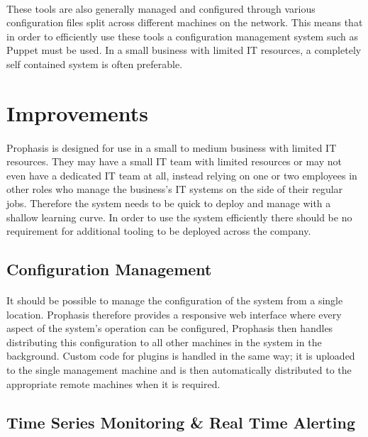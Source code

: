 \documentclass[bsc,logo,twoside]{infthesis}
\begin{document}
\paragraph*{}	
	These tools are also generally managed and configured through various
	configuration files split across different machines on the network. This means
	that in order to efficiently use these tools a configuration management system
	such as	Puppet must be used. In a small business with limited IT resources, a
	completely self contained system is often preferable.

\section{Improvements}
\paragraph*{}
	Prophasis is designed for use in a small to medium business with limited IT
	resources.  They may have a small IT team with limited resources or may not
	even have a dedicated IT team at all, instead relying on one or two employees
	in other roles who manage the business's IT systems on the side of their
	regular jobs. Therefore the system needs to be quick to deploy and manage with
	a shallow learning curve. In order to use the system efficiently there should
	be no requirement for additional tooling to be deployed across the company.
	
\subsection{Configuration Management}
\paragraph*{}
	It should be possible to manage the configuration of the system from a single
	location.  Prophasis therefore provides a responsive web interface where every
	aspect of the system's operation can be configured, Prophasis then handles
	distributing this configuration to all other machines in the system in the
	background. Custom code for plugins is handled in the same way; it is uploaded
	to the single management machine and is then automatically distributed to the
	appropriate remote machines when it is required.
	
\subsection{Time Series Monitoring \& Real Time Alerting}
\end{document}
